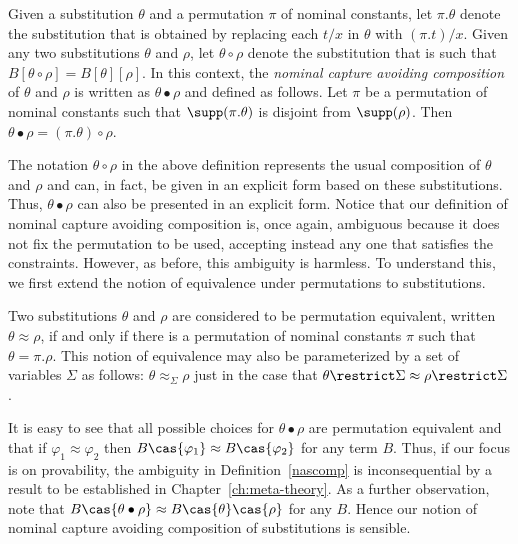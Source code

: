\begin{definition}\label{nascomp}
Given a substitution $\theta$ and a permutation $\pi$ of nominal
constants, let $\pi.\theta$ denote
the substitution that is obtained by replacing each $t/x$ in $\theta$
with $(\pi.t)/x$. Given any two substitutions $\theta$ and $\rho$, let
$\theta \circ \rho$ denote the substitution that is such that
$B[\theta\circ \rho] = B[\theta][\rho]$. In this context, the {\em
  nominal capture   avoiding composition} of $\theta$ and $\rho$ is
written as $\theta\bullet\rho$ and defined as follows. Let $\pi$ be a
permutation of nominal constants such that
$\supp(\pi.\theta)$ is disjoint from $\supp(\rho)$. Then
$\theta\bullet\rho = (\pi.\theta)\circ \rho$.
\end{definition}\label{substequiv}
The notation $\theta \circ \rho$ in the above definition represents
the usual composition of $\theta$ and $\rho$ and can, in fact, be
given in an explicit form based on these substitutions. Thus, $\theta
\bullet \rho$ can also be presented in an explicit form. Notice that our
definition of nominal capture avoiding composition is, once again,
ambiguous because it does not fix the permutation to be used,
accepting instead any one that satisfies the constraints. However, as
before, this ambiguity is harmless. To understand this, we first
extend the notion of equivalence under permutations to substitutions.
\begin{definition}
Two substitutions $\theta$ and $\rho$ are considered to be permutation
equivalent, written $\theta \approx \rho$, if and only if there is a
permutation of nominal constants $\pi$ such that $\theta =
\pi.\rho$. This notion of equivalence may also be parameterized by a
set of variables $\Sigma$ as follows: $\theta \approx_\Sigma \rho$
just in the case that $\theta \restrict \Sigma \approx \rho \restrict
\Sigma$.
\end{definition}
It is easy to see that all possible choices for $\theta \bullet \rho$
are permutation equivalent and that if $\varphi_1 \approx \varphi_2$
then $B\cas{\varphi_1} \approx B\cas{\varphi_2}$ for any term $B$.
Thus, if our focus is on provability, the ambiguity in
Definition~\ref{nascomp} is inconsequential by a result to be
established in Chapter~\ref{ch:meta-theory}. As a further observation,
note that $B\cas{\theta\bullet\rho} \approx B\cas{\theta}\cas{\rho}$
for any $B$. Hence our notion of nominal capture avoiding composition
of substitutions is sensible.

